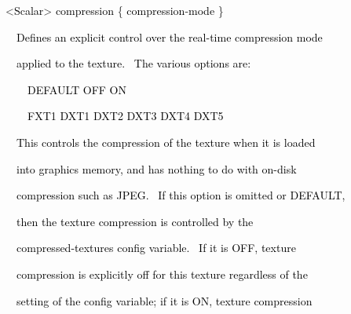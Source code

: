 \documentclass[a4paper]{article}
\newcommand\textstyleOOoComputerKeyWord[1]{\textrm{\textcolor[rgb]{0.0,0.0,0.5019608}{#1}}}
\newcommand\textstyleOOoAssemblerSpecialChar[1]{\textrm{\textcolor[rgb]{0.0,0.5019608,0.0}{#1}}}
\newcommand\textstyleOOoAssemblerIdent[1]{\textrm{\textcolor{black}{#1}}}
\begin{document}
{\color{black}
\textstyleOOoComputerKeyWord{\textcolor{black}{\ \ }}\textstyleOOoAssemblerSpecialChar{{\textless}}\textstyleOOoAssemblerIdent{Scalar}\textstyleOOoAssemblerSpecialChar{{\textgreater}}\textstyleOOoComputerKeyWord{\textcolor{black}{
}}\textstyleOOoAssemblerIdent{compression}\textstyleOOoComputerKeyWord{\textcolor{black}{
}}\textstyleOOoAssemblerSpecialChar{\{}\textstyleOOoComputerKeyWord{\textcolor{black}{
}}\textstyleOOoAssemblerIdent{compression}\textstyleOOoAssemblerSpecialChar{{}-}\textstyleOOoAssemblerIdent{mode}\textstyleOOoComputerKeyWord{\textcolor{black}{
}}\textstyleOOoAssemblerSpecialChar{\}}}


\bigskip

{\color{black}
\textstyleOOoComputerKeyWord{\textcolor{black}{\ \ \ \ Defines an explicit control over the real-time compression
mode}}}

{\color{black}
\textstyleOOoComputerKeyWord{\textcolor{black}{\ \ \ \ applied to the texture. \ The various options are:}}}


\bigskip

{\color{black}
\textstyleOOoComputerKeyWord{\textcolor{black}{\ \ \ \ \ \ DEFAULT OFF ON}}}

{\color{black}
\textstyleOOoComputerKeyWord{\textcolor{black}{\ \ \ \ \ \ FXT1 DXT1 DXT2 DXT3 DXT4 DXT5}}}


\bigskip

{\color{black}
\textstyleOOoComputerKeyWord{\textcolor{black}{\ \ \ \ This controls the compression of the texture when it is loaded}}}

{\color{black}
\textstyleOOoComputerKeyWord{\textcolor{black}{\ \ \ \ into graphics memory, and has nothing to do with on-disk}}}

{\color{black}
\textstyleOOoComputerKeyWord{\textcolor{black}{\ \ \ \ compression such as JPEG. \ If this option is omitted or
{\textquotedbl}DEFAULT{\textquotedbl},}}}

{\color{black}
\textstyleOOoComputerKeyWord{\textcolor{black}{\ \ \ \ then the texture compression is controlled by the}}}

{\color{black}
\textstyleOOoComputerKeyWord{\textcolor{black}{\ \ \ \ compressed-textures config variable. \ If it is
{\textquotedbl}OFF{\textquotedbl}, texture}}}

{\color{black}
\textstyleOOoComputerKeyWord{\textcolor{black}{\ \ \ \ compression is explicitly off for this texture regardless of
the}}}

{\color{black}
\textstyleOOoComputerKeyWord{\textcolor{black}{\ \ \ \ setting of the config variable; if it is
{\textquotedbl}ON{\textquotedbl}, texture compression}}}
\end{document}
